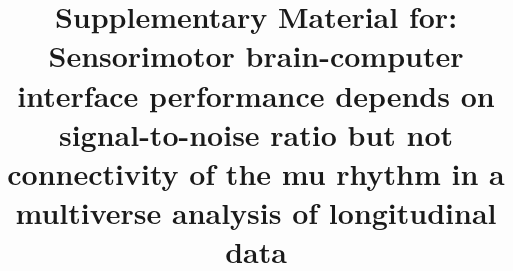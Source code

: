 \documentclass[preprint,authoryear,semicolon,12pt]{elsarticle}
\numberwithin{equation}{section}
\begin{document}
\begin{frontmatter}


\title{Supplementary Material for: Sensorimotor brain-computer interface performance depends on signal-to-noise ratio but not connectivity of the mu rhythm in a multiverse analysis of longitudinal data}



\end{frontmatter}


\newpage


\end{document}

